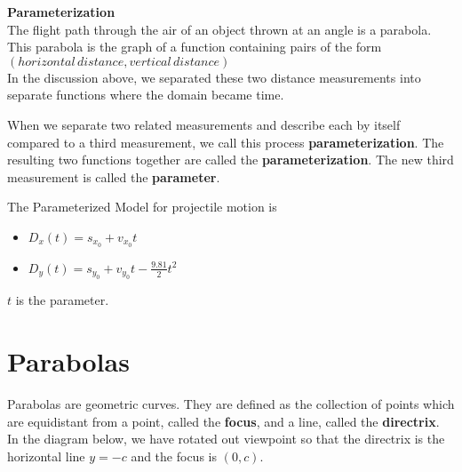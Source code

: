 \documentclass{ximera}
\begin{document}
\begin{definition} \textbf{\textcolor{green!50!black}{Parameterization}} \\

The flight path through the air of an object thrown at an angle is a parabola.  This parabola is the graph of a function containing pairs of the form $(horizontal \, distance, vertical \,distance)$ \\

In the discussion above, we separated these two distance measurements into separate functions where the domain became time.



When we separate two related measurements and describe each by itself compared to a third measurement, we call this process \textbf{parameterization}.  The resulting two functions together are called the \textbf{parameterization}.  The new third measurement is called the \textbf{parameter}.





\begin{model} 


The Parameterized Model for projectile motion is


\begin{itemize}
\item $D_x(t) = s_{x_0} + v_{x_0} t$
\item $D_y(t) = s_{y_0} + v_{y_0} t - \frac{9.81}{2} t^2$
\end{itemize}

$t$ is the parameter.

\end{model}



\end{definition}

















\section{Parabolas}

Parabolas are geometric curves.  They are defined as the collection of points which are equidistant from a point, called the \textbf{focus}, and a line, called the \textbf{directrix}.  In the diagram below,  we have rotated out viewpoint so that the directrix is the horizontal line $y = -c$ and the focus is $(0,c)$.
\end{document}
